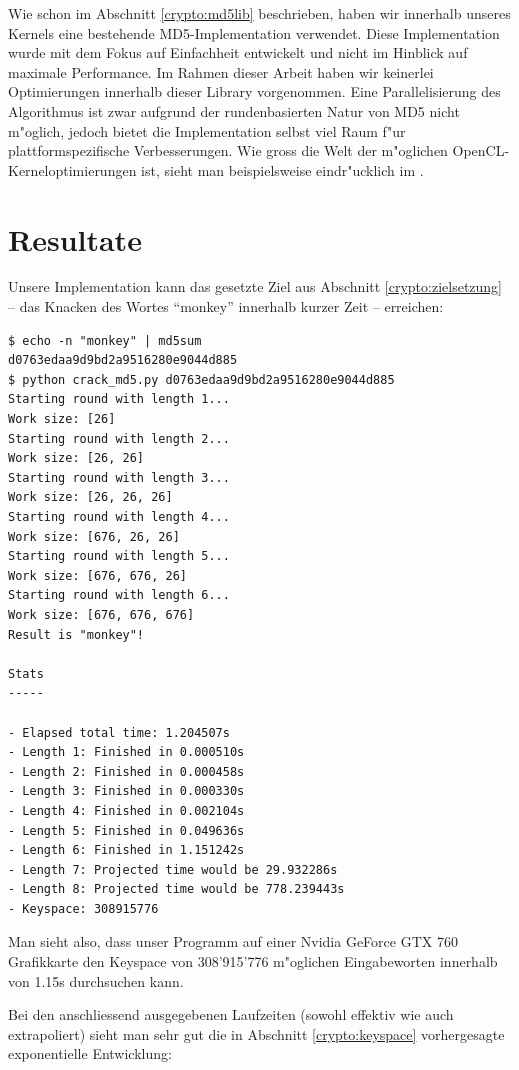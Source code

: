 \begin{refsection}
Wie schon im Abschnitt \ref{crypto:md5lib} beschrieben, haben wir innerhalb
unseres Kernels eine bestehende MD5-Implementation verwendet. Diese
Implementation wurde mit dem Fokus auf Einfachheit entwickelt und nicht im
Hinblick auf maximale Performance. Im Rahmen dieser Arbeit haben wir keinerlei
Optimierungen innerhalb dieser Library vorgenommen. Eine Parallelisierung des
Algorithmus ist zwar aufgrund der rundenbasierten Natur von MD5 nicht m"oglich,
jedoch bietet die Implementation selbst viel Raum f"ur plattformspezifische
Verbesserungen. Wie gross die Welt der m"oglichen OpenCL-Kerneloptimierungen
ist, sieht man beispielsweise eindr"ucklich im
 \cite{crypto:nvidia_bestpractices}.


\section{Resultate}

Unsere Implementation kann das gesetzte Ziel aus Abschnitt
\ref{crypto:zielsetzung} -- das Knacken des Wortes ``monkey'' innerhalb
kurzer Zeit -- erreichen:

\begin{small}
\begin{verbatim}
$ echo -n "monkey" | md5sum
d0763edaa9d9bd2a9516280e9044d885
$ python crack_md5.py d0763edaa9d9bd2a9516280e9044d885
Starting round with length 1...
Work size: [26]
Starting round with length 2...
Work size: [26, 26]
Starting round with length 3...
Work size: [26, 26, 26]
Starting round with length 4...
Work size: [676, 26, 26]
Starting round with length 5...
Work size: [676, 676, 26]
Starting round with length 6...
Work size: [676, 676, 676]
Result is "monkey"!

Stats
-----

- Elapsed total time: 1.204507s
- Length 1: Finished in 0.000510s
- Length 2: Finished in 0.000458s
- Length 3: Finished in 0.000330s
- Length 4: Finished in 0.002104s
- Length 5: Finished in 0.049636s
- Length 6: Finished in 1.151242s
- Length 7: Projected time would be 29.932286s
- Length 8: Projected time would be 778.239443s
- Keyspace: 308915776
\end{verbatim}
\end{small}

Man sieht also, dass unser Programm auf einer Nvidia GeForce GTX 760 Grafikkarte
den Keyspace von 308'915'776 m"oglichen Eingabeworten innerhalb von 1.15s
durchsuchen kann.

Bei den anschliessend ausgegebenen Laufzeiten (sowohl effektiv wie auch
extrapoliert) sieht man sehr gut die in Abschnitt \ref{crypto:keyspace}
vorhergesagte exponentielle Entwicklung:


\end{refsection}
